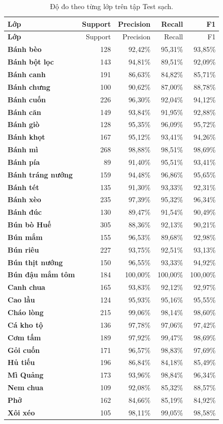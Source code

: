\begin{longtable}{>{\bfseries}p{4.1cm}rrrr}
\caption{Độ đo theo từng lớp trên tập Test sạch.}\label{tab:per-class}\\
\toprule Lớp & Support & Precision & Recall & F1 \\
\midrule \endfirsthead
\toprule Lớp & Support & Precision & Recall & F1 \\
\midrule \endhead
Bánh bèo & 128 & 92,42\% & 95,31\% & 93,85\% \\
Bánh bột lọc & 143 & 94,81\% & 89,51\% & 92,09\% \\
Bánh canh & 191 & 86,63\% & 84,82\% & 85,71\% \\
Bánh chưng & 100 & 90,62\% & 87,00\% & 88,78\% \\
Bánh cuốn & 226 & 96,30\% & 92,04\% & 94,12\% \\
Bánh căn & 149 & 93,84\% & 91,95\% & 92,88\% \\
Bánh giò & 128 & 95,35\% & 96,09\% & 95,72\% \\
Bánh khọt & 167 & 95,12\% & 93,41\% & 94,26\% \\
Bánh mì & 268 & 98,88\% & 98,51\% & 98,69\% \\
Bánh pía & 89 & 91,40\% & 95,51\% & 93,41\% \\
Bánh tráng nướng & 159 & 94,48\% & 96,86\% & 95,65\% \\
Bánh tét & 135 & 91,30\% & 93,33\% & 92,31\% \\
Bánh xèo & 235 & 97,39\% & 95,32\% & 96,34\% \\
Bánh đúc & 130 & 89,47\% & 91,54\% & 90,49\% \\
Bún bò Huế & 305 & 88,36\% & 92,13\% & 90,21\% \\
Bún mắm & 155 & 96,53\% & 89,68\% & 92,98\% \\
Bún riêu & 227 & 93,75\% & 92,51\% & 93,13\% \\
Bún thịt nướng & 150 & 96,55\% & 93,33\% & 94,92\% \\
Bún đậu mắm tôm & 184 & 100,00\% & 100,00\% & 100,00\% \\
Canh chua & 165 & 93,83\% & 92,12\% & 92,97\% \\
Cao lầu & 124 & 95,93\% & 95,16\% & 95,55\% \\
Cháo lòng & 215 & 99,06\% & 98,14\% & 98,60\% \\
Cá kho tộ & 136 & 97,78\% & 97,06\% & 97,42\% \\
Cơm tấm & 189 & 97,92\% & 99,47\% & 98,69\% \\
Gỏi cuốn & 171 & 96,57\% & 98,83\% & 97,69\% \\
Hủ tiếu & 196 & 86,84\% & 84,18\% & 85,49\% \\
Mì Quảng & 173 & 93,96\% & 98,84\% & 96,34\% \\
Nem chua & 109 & 92,08\% & 85,32\% & 88,57\% \\
Phở & 162 & 84,66\% & 85,19\% & 84,92\% \\
Xôi xéo & 105 & 98,11\% & 99,05\% & 98,58\% \\
\bottomrule
\end{longtable}
